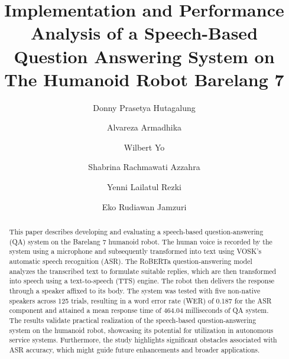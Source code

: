 \documentclass{../styles/svproc}
\begin{document}
\mainmatter              %
%
\title{Implementation and Performance Analysis of a Speech-Based Question Answering System on The Humanoid Robot Barelang 7}
%
%
\author{Donny Prasetya Hutagalung \and Alvareza Armadhika \and
Wilbert Yo \and Shabrina Rachmawati Azzahra \and Yenni Lailatul Rezki \and
Eko Rudiawan Jamzuri\inst{*}}
%
%
%

\maketitle              %

\begin{abstract}
This paper describes developing and evaluating a speech-based question-answering (QA) system on the Barelang 7 humanoid robot. The human voice is recorded by the system using a microphone and subsequently transformed into text using VOSK's automatic speech recognition (ASR). The RoBERTa question-answering model analyzes the transcribed text to formulate suitable replies, which are then transformed into speech using a text-to-speech (TTS) engine. The robot then delivers the response through a speaker affixed to its body. The system was tested with five non-native speakers across 125 trials, resulting in a word error rate (WER) of 0.187 for the ASR component and attained a mean response time of 464.04 milliseconds of QA system. The results validate practical realization of the speech-based question-answering system on the humanoid robot, showcasing its potential for utilization in autonomous service systems. Furthermore, the study highlights significant obstacles associated with ASR accuracy, which might guide future enhancements and broader applications.

\end{abstract}
\end{document}
